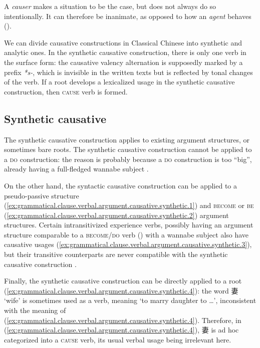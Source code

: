 \documentclass[UTF8, a4paper, oneside, scheme=plain, 12pt]{ctexrep}
\newcommand*{\citepage}[1]{p.~{#1}}
\newcommand*{\term}[1]{\emph{#1}}
\newcommand{\form}[1]{\emph{#1}}
\newcommand{\translate}[1]{`#1'}
\newcommand*{\category}[1]{\textsc{#1}}
\begin{document}
A \term{causer} makes a situation to be the case,
but does not always do so intentionally.
It can therefore be inanimate,
as opposed to how an \term{agent} behaves
().

We can divide causative constructions in Classical Chinese into
synthetic and analytic ones.
In the synthetic causative construction,
there is only one verb in the surface form:
the causative valency alternation is supposedly marked by a prefix \form{*s-},
which is invisible in the written texts but is reflected by tonal changes of the verb.
If a root develops a lexicalized usage in the synthetic causative construction,
then \category{cause} verb is formed.

\subsection{Synthetic causative}\label{sec:grammatical.clause.verbal.argument-structure.causative.synthetic}

The synthetic causative construction applies to existing argument structures, or sometimes bare roots.
The synthetic causative construction cannot be applied to a \category{do} construction:
the reason is probably because a \category{do} construction is too ``big'',
already having a full-fledged wannabe subject \citep[\citepage{363-364}]{meiguang2018}.

On the other hand, the syntactic causative construction can be applied to 
a pseudo-passive structure (\ref{ex:grammatical.clause.verbal.argument.causative.synthetic.1})
and \category{become} or \category{be} (\ref{ex:grammatical.clause.verbal.argument.causative.synthetic.2}) argument structures.
Certain intransitivized experience verbs,
possibly having an argument structure comparable to a \category{become}/\category{do} verb () with a wannabe subject also have causative usages
(\ref{ex:grammatical.clause.verbal.argument.causative.synthetic.3}),
but their transitive counterparts are never compatible with the synthetic causative construction
\citep[\citepage{274}]{meiguang2018}.

Finally, the synthetic causative construction can be directly applied to a root (\ref{ex:grammatical.clause.verbal.argument.causative.synthetic.4}):
the word 妻 \translate{wife} is sometimes used as a verb,
meaning \translate{to marry daughter to \dots},
inconsistent with the meaning of (\ref{ex:grammatical.clause.verbal.argument.causative.synthetic.4}).
Therefore, in (\ref{ex:grammatical.clause.verbal.argument.causative.synthetic.4}),
妻 is ad hoc categorized into a \category{cause} verb,
its usual verbal usage being irrelevant here.
\end{document}
